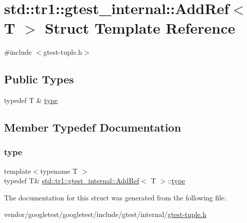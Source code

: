 \hypertarget{structstd_1_1tr1_1_1gtest__internal_1_1_add_ref}{}\section{std\+:\+:tr1\+:\+:gtest\+\_\+internal\+:\+:Add\+Ref$<$ T $>$ Struct Template Reference}
\label{structstd_1_1tr1_1_1gtest__internal_1_1_add_ref}


{\ttfamily \#include $<$gtest-\/tuple.\+h$>$}

\subsection*{Public Types}
\begin{DoxyCompactItemize}
\item 
typedef T \& \hyperlink{structstd_1_1tr1_1_1gtest__internal_1_1_add_ref_a1e5616e414125574c1653e3a1fc68491}{type}
\end{DoxyCompactItemize}


\subsection{Member Typedef Documentation}
\mbox{\label{structstd_1_1tr1_1_1gtest__internal_1_1_add_ref_a1e5616e414125574c1653e3a1fc68491}} 
\subsubsection{\texorpdfstring{type}{type}}
{\footnotesize\ttfamily template$<$typename T $>$ \\
typedef T\& \hyperlink{structstd_1_1tr1_1_1gtest__internal_1_1_add_ref}{std\+::tr1\+::gtest\+\_\+internal\+::\+Add\+Ref}$<$ T $>$\+::\hyperlink{structstd_1_1tr1_1_1gtest__internal_1_1_add_ref_a1e5616e414125574c1653e3a1fc68491}{type}}



The documentation for this struct was generated from the following file\+:\begin{DoxyCompactItemize}
\item 
vendor/googletest/googletest/include/gtest/internal/\hyperlink{gtest-tuple_8h}{gtest-\/tuple.\+h}\end{DoxyCompactItemize}
